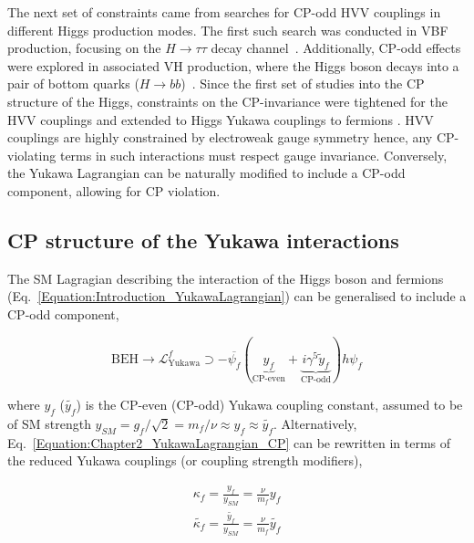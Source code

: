 The next set of constraints came from searches for CP-odd 
HVV couplings in different Higgs production modes. The first such search was conducted in VBF production, focusing on the 
$H\to\tau\tau$ decay channel~\cite{CP_constraints_4}. Additionally, CP-odd effects were explored in associated VH production, where the Higgs boson decays into a pair of bottom quarks ($H\to bb$)~\cite{CP_constraints_5}. Since the first set of studies into the CP structure of the Higgs, constraints on the CP-invariance were tightened for the HVV couplings and extended to Higgs Yukawa couplings to fermions \cite{CP_constraints_6,CP_constraints_7,CP_constraints_8,CP_constraints_9,CP_constraints_10,CP_constraints_11,CP_constraints_12,CP_constraints_13,CP_constraints_14,CP_constraints_15,CP_constraints_16,CP_constraints_17,CP_constraints_18,CP_constraints_19,CP_constraints_20,CP_constraints_21,CP_constraints_22}. HVV couplings are highly constrained by electroweak gauge symmetry hence, any CP-violating terms in such interactions must respect gauge invariance. Conversely, the Yukawa Lagrangian can be naturally modified to include a CP-odd component, allowing for CP violation.

\subsection{CP structure of the Yukawa interactions}

The SM Lagragian describing the interaction of the Higgs boson and fermions (Eq.~\ref{Equation:Introduction_YukawaLagrangian}) can be generalised to include a CP-odd component,

\begin{equation}
    \text{BEH} \rightarrow \mathcal{L}_{\text{Yukawa}}^f \supset - \overline{\psi_f} (\underbrace{y_f}_{\text{CP-even}} + \underbrace{i\gamma^5\tilde{y}_f}_{\text{CP-odd}})h\psi_f
\label{Equation:Chapter2_YukawaLagrangian_CP}
\end{equation}

where $y_f$ ($\tilde{y_f}$) is the CP-even (CP-odd) Yukawa coupling constant, assumed to be of SM strength \ie $y_{SM} = g_f/\sqrt{2}=m_f/\nu\approx y_f \approx \tilde{y_f}$. Alternatively, Eq.~\ref{Equation:Chapter2_YukawaLagrangian_CP} can be rewritten in terms of the reduced Yukawa couplings (or coupling strength modifiers),

\begin{equation}
\begin{aligned}
    \kappa_f = \frac{y_f}{y_{SM}}=\frac{\nu}{m_f}y_f \\
    \tilde{\kappa_f} = \frac{\tilde{y_f}}{y_{SM}}=\frac{\nu}{m_f}\tilde{y_f} \\
\end{aligned}
\end{equation}

